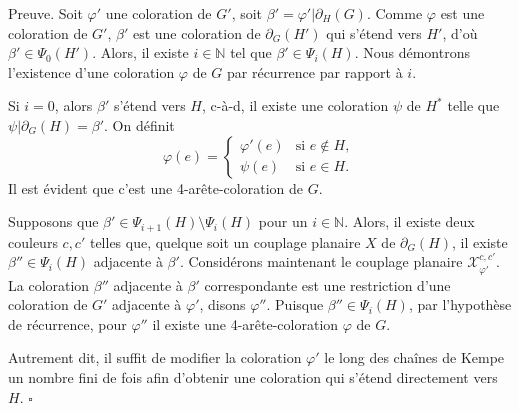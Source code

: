 \documentclass[10pt,a4paper]{article}
\newtheorem{definition}{Définition}
\newcommand{\ep}{{\hfill $\square$}}
\begin{document}
Preuve. Soit $\varphi'$ une coloration de $G'$, soit $\beta'=\varphi'|\partial_H(G)$. Comme $\varphi$ est une coloration de $G'$, $\beta'$ est une coloration de $\partial_G(H')$ qui s'étend vers $H'$, d'où $\beta'\in \Psi_0(H')$.
Alors, il existe $i\in \mathbb{N}$ tel que $\beta' \in \Psi_{i}(H)$.
Nous démontrons l'existence d'une coloration $\varphi$ de $G$ par récurrence par rapport à $i$.

Si $i=0$, alors $\beta'$ s'étend vers $H$, c-à-d, il existe une coloration $\psi$ de $H^*$ telle que $\psi|\partial_G(H)=\beta'$. On définit
$$
\varphi (e) = 
\begin{cases}
\varphi'(e) & \text{si }e\notin H, \\
\psi(e) & \text{si } e\in H.
\end{cases}
$$
Il est évident que c'est une 4-arête-coloration de $G$.

Supposons que $\beta' \in \Psi_{i+1}(H)\setminus \Psi_i(H)$ pour un $i\in \mathbb{N}$. Alors, il existe deux couleurs $c,c'$ telles que, quelque soit un couplage planaire $X$ de $\partial_G(H)$, il existe $\beta''\in \Psi_i(H)$ adjacente à $\beta'$. Considérons maintenant le couplage planaire $\mathcal{X}_{\varphi'}^{c,c'}$. La coloration $\beta''$ adjacente à $\beta'$ correspondante est une restriction d'une coloration de $G'$ adjacente à $\varphi'$, disons $\varphi''$. Puisque $\beta''\in \Psi_i(H)$, par l'hypothèse de récurrence, pour $\varphi''$ il existe une 4-arête-coloration $\varphi$ de $G$.

Autrement dit, il suffit de modifier la coloration $\varphi'$ le long des chaînes de Kempe un nombre fini de fois afin d'obtenir une coloration qui s'étend directement vers $H$. \ep
 


\end{document}
